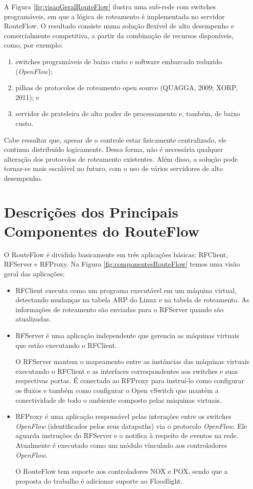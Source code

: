 A Figura \ref{fig:visaoGeralRouteFlow} ilustra uma sub-rede com
switches programáveis, em que a lógica de roteamento é
implementada no servidor RouteFlow. O resultado consiste
numa solução flexível de alto desempenho e comercialmente
competitiva, a partir da combinação de recursos disponíveis,
como, por exemplo:

\begin{enumerate}[{a)}] 
\item switches programáveis de baixo
custo e software embarcado reduzido (\textit{OpenFlow}); 
\item pilhas de protocolos de roteamento open source (QUAGGA, 2009; XORP,
2011); e 
\item servidor de prateleira de alto poder de
processamento e, também, de baixo custo. 
\end{enumerate}

Cabe ressaltar que, apesar de o controle estar fisicamente
centralizado, ele continua distribuído logicamente. Dessa
forma, não é necessária qualquer alteração dos protocolos de
roteamento existentes. Além disso, a solução pode tornar-se
mais escalável no futuro, com o uso
de vários servidores de alto desempenho.

\section{Descrições dos Principais Componentes do RouteFlow}
O RouteFlow é dividido basicamente em três aplicações
básicas: RFClient, RFServer e RFProxy. Na Figura
\ref{fig:componentesRouteFlow} temos uma visão geral das
aplicações:

\begin{itemize} 
\item RFClient executa como um programa
executável em um máquina virtual, detectando
mudanças na tabela ARP do Linux e na tabela de roteamento.
As informações de roteamento são enviadas para o
RFServer quando são atualizadas.
\item RFServer é uma aplicação independente que gerencia as
máquinas virtuais que estão executando o RFClient. 

O RFServer mantem o mapeamento entre as instâncias das
máquinas virtuais executando o RFClient e as interfaces
correspondentes aos switches e suas respectivas portas. É
conectado ao RFProxy para instruí-lo como configurar os
fluxos e também como configurar o Open vSwitch que mantém a
conectividade de todo o ambiente composto pelas máquinas virtuais.
\item RFProxy é uma aplicação responsável pelas interações
entre os switches \textit{OpenFlow} (identificados pelos seus
datapaths) via o protocolo \textit{OpenFlow}. Ele aguarda instruções
do RFServer e o notifica à respeito de eventos na rede.
Atualmente é executado como um módulo vinculado aos
controladores \textit{OpenFlow}. 

O RouteFlow tem suporte aos
controladores NOX e POX, sendo que a proposta do trabalho é
adicionar suporte ao Floodlight. 
\end{itemize}


